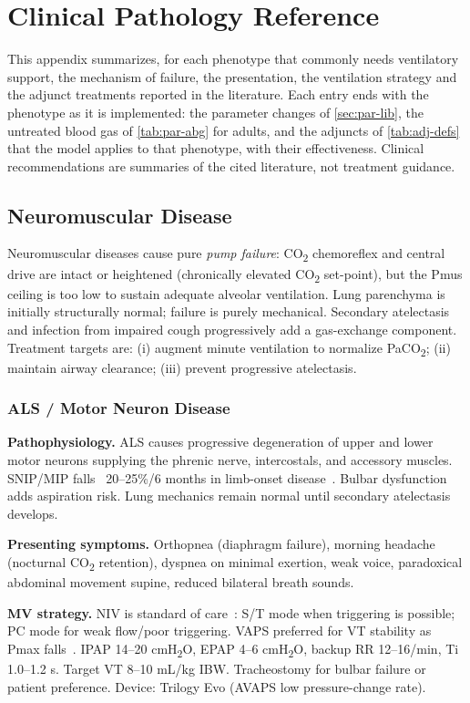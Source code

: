 \chapter{Clinical Pathology Reference}
\label{app:clin}

This appendix summarizes, for each phenotype that commonly needs ventilatory support, the mechanism of failure, the presentation, the ventilation strategy and the adjunct treatments reported in the literature. Each entry ends with the phenotype as it is implemented: the parameter changes of \cref{sec:par-lib}, the untreated blood gas of \cref{tab:par-abg} for adults, and the adjuncts of \cref{tab:adj-defs} that the model applies to that phenotype, with their effectiveness. Clinical recommendations are summaries of the cited literature, not treatment guidance.

\section{Neuromuscular Disease}
Neuromuscular diseases cause pure \emph{pump failure}: CO\textsubscript{2} chemoreflex and central drive are intact or heightened (chronically elevated CO\textsubscript{2} set-point), but the Pmus ceiling is too low to sustain adequate alveolar ventilation. Lung parenchyma is initially structurally normal; failure is purely mechanical. Secondary atelectasis and infection from impaired cough progressively add a gas-exchange component. Treatment targets are: (i) augment minute ventilation to normalize PaCO\textsubscript{2}; (ii) maintain airway clearance; (iii) prevent progressive atelectasis.

\subsection{ALS / Motor Neuron Disease}
\textbf{Pathophysiology.} ALS causes progressive degeneration of upper and lower motor neurons supplying the phrenic nerve, intercostals, and accessory muscles. SNIP/MIP falls ~20--25\%/6 months in limb-onset disease~\citep{miller2009a}. Bulbar dysfunction adds aspiration risk. Lung mechanics remain normal until secondary atelectasis develops.

\textbf{Presenting symptoms.} Orthopnea (diaphragm failure), morning headache (nocturnal CO\textsubscript{2} retention), dyspnea on minimal exertion, weak voice, paradoxical abdominal movement supine, reduced bilateral breath sounds.

\textbf{MV strategy.} NIV is standard of care~\citep{bourke2006,miller2009a}: S/T mode when triggering is possible; PC mode for weak flow/poor triggering. VAPS preferred for VT stability as Pmax falls~\citep{nicholson2019}. IPAP 14--20 cmH\textsubscript{2}O, EPAP 4--6 cmH\textsubscript{2}O, backup RR 12--16/min, Ti 1.0--1.2 s. Target VT 8--10 mL/kg IBW. Tracheostomy for bulbar failure or patient preference. Device: Trilogy Evo (AVAPS low pressure-change rate).

